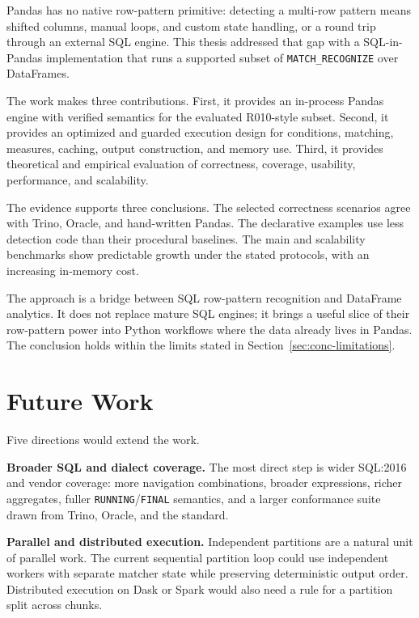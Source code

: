 Pandas has no native row-pattern primitive: detecting a multi-row
pattern means shifted columns, manual loops, and custom state
handling, or a round trip through an external SQL engine.  This thesis
addressed that gap with a SQL-in-Pandas implementation that
runs a supported subset of \texttt{MATCH\_RECOGNIZE} over
DataFrames.

The work makes three contributions.  First, it provides an in-process
Pandas engine with verified semantics for the evaluated R010-style
subset.  Second, it provides an optimized and guarded execution design
for conditions, matching, measures, caching, output construction, and
memory use.  Third, it provides
theoretical and empirical evaluation of correctness, coverage,
usability, performance, and scalability.

The evidence supports three conclusions.  The selected correctness
scenarios agree with Trino, Oracle, and hand-written Pandas.
The declarative examples use less detection code than their procedural
baselines.  The main and scalability benchmarks show predictable
growth under the stated protocols, with an increasing in-memory cost.

The approach is a bridge between SQL row-pattern
recognition and DataFrame analytics.  It does not replace mature SQL
engines; it brings a useful slice of their row-pattern power into
Python workflows where the data already lives in Pandas.
The conclusion holds within the limits stated in
Section~\ref{sec:conc-limitations}.

\section{Future Work}
\label{sec:conc-future}

Five directions would extend the work.

\textbf{Broader SQL and dialect coverage.}
The most direct step is wider SQL:2016 and vendor coverage: more
navigation combinations, broader expressions, richer aggregates, fuller
\texttt{RUNNING}/\texttt{FINAL} semantics, and a larger conformance
suite drawn from Trino, Oracle, and the standard.

\textbf{Parallel and distributed execution.}
Independent partitions are a natural unit of parallel work.  The
current sequential partition loop could use independent workers with
separate matcher state while preserving deterministic output order.
Distributed execution on Dask or Spark would also need a rule for a
partition split across chunks.

